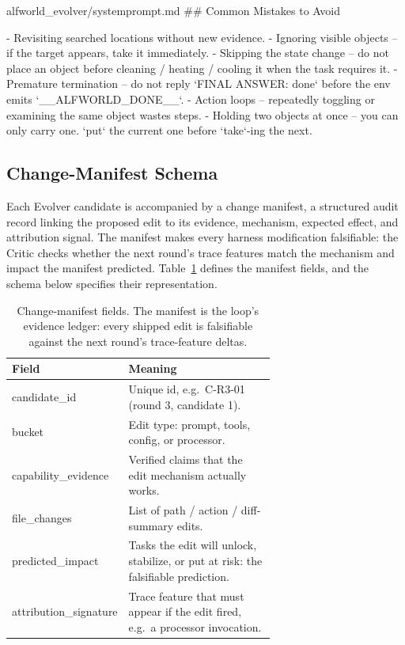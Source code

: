 \begin{promptfile}{alfworld\_evolver/systemprompt.md}
## Common Mistakes to Avoid

- Revisiting searched locations without new evidence.
- Ignoring visible objects -- if the target appears, take it immediately.
- Skipping the state change -- do not place an object before cleaning / heating
  / cooling it when the task requires it.
- Premature termination -- do not reply `FINAL ANSWER: done` before the env
  emits `__ALFWORLD_DONE__`.
- Action loops -- repeatedly toggling or examining the same object wastes steps.
- Holding two objects at once -- you can only carry one. `put` the current one
  before `take`-ing the next.
\end{promptfile}


\subsection{Change-Manifest Schema}
\label{app:manifest-schema}

Each Evolver candidate is accompanied by a change manifest, a structured audit record linking the proposed edit to its evidence, mechanism, expected effect, and attribution signal. The manifest makes every harness modification falsifiable: the Critic checks whether the next round's trace features match the mechanism and impact the manifest predicted. Table~\ref{tab:manifest-fields} defines the manifest fields, and the schema below specifies their representation.

\begin{table}[!htbp]
\centering
\small
\caption{Change-manifest fields. The manifest is the loop's evidence ledger:
every shipped edit is falsifiable against the next round's trace-feature deltas.}
\label{tab:manifest-fields}
\begin{tabular}{lp{0.66\linewidth}}
\toprule
\textbf{Field} & \textbf{Meaning} \\
\midrule
candidate\_id        & Unique id, e.g.\ C-R3-01 (round 3, candidate 1). \\
bucket               & Edit type: prompt, tools, config, or processor. \\
capability\_evidence & Verified claims that the edit mechanism actually works. \\
file\_changes        & List of path / action / diff-summary edits. \\
predicted\_impact    & Tasks the edit will unlock, stabilize, or put at risk: the falsifiable prediction. \\
attribution\_signature & Trace feature that must appear if the edit fired, e.g.\ a processor invocation. \\
\bottomrule
\end{tabular}
\end{table}

